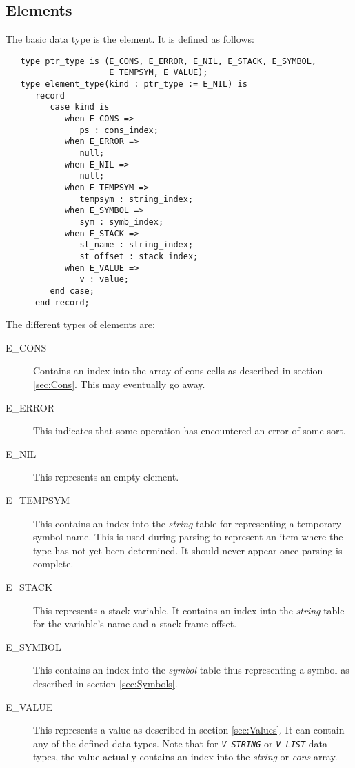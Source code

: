 \documentclass[10pt, openany]{book}
\newcommand{\constant}[1]{\emph{\texttt{#1}}}
\begin{document}
\subsection{Elements}
The basic data type is the element.  It is defined as follows:
\lstset{language=Ada}
\begin{lstlisting}
   type ptr_type is (E_CONS, E_ERROR, E_NIL, E_STACK, E_SYMBOL,
                     E_TEMPSYM, E_VALUE);
   type element_type(kind : ptr_type := E_NIL) is
      record
         case kind is
            when E_CONS =>
               ps : cons_index;
            when E_ERROR =>
               null;
            when E_NIL =>
               null;
            when E_TEMPSYM =>
               tempsym : string_index;
            when E_SYMBOL =>
               sym : symb_index;
            when E_STACK =>
               st_name : string_index;
               st_offset : stack_index;
            when E_VALUE =>
               v : value;
         end case;
      end record;
\end{lstlisting}

The different types of elements are:
\begin{description}
  \item[E\_CONS] Contains an index into the array of cons cells as described in section \ref{sec:Cons}.  This may eventually go away.
  \item[E\_ERROR]  This indicates that some operation has encountered an error of some sort.
  \item[E\_NIL] This represents an empty element.
  \item[E\_TEMPSYM] This contains an index into the \emph{string} table for representing a temporary symbol name.  This is used during parsing to represent an item where the type has not yet been determined.  It should never appear once parsing is complete.
  \item[E\_STACK] This represents a stack variable.  It contains an index into the \emph{string} table for the variable's name and a stack frame offset.
  \item[E\_SYMBOL] This contains an index into the \emph{symbol} table thus representing a symbol as described in section \ref{sec:Symbols}.
  \item[E\_VALUE] This represents a value as described in section \ref{sec:Values}.  It can contain any of the defined data types.  Note that for \constant{V\_STRING} or \constant{V\_LIST} data types, the value actually contains an index into the \emph{string} or \emph{cons} array.
\end{description}
\end{document}
